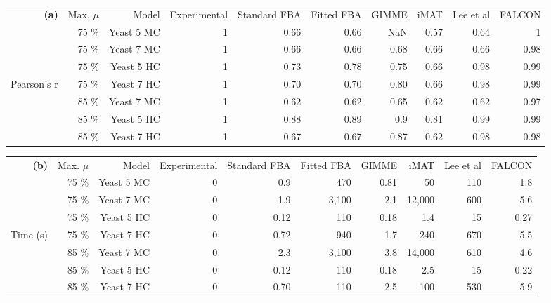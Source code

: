 \begin{table*}
\begin{center}
\small
\begin{tabular}{rrrrrrrrrr}
\textbf{(a)} \hspace{1.2cm} & Max. $\mu$ & Model & Experimental & 
  Standard FBA & Fitted FBA & GIMME & iMAT & Lee et al & FALCON\\
 & 75 \%& Yeast 5 MC & 1 & 0.66 & 0.66 & NaN  & 0.57 & 0.64 & 1 \\
 & 75 \%& Yeast 7 MC & 1 & 0.66 & 0.66 & 0.68 & 0.66 & 0.66 & 0.98\\
 & 75 \%& Yeast 5 HC & 1 & 0.73 & 0.78 & 0.75 & 0.66 & 0.98 & 0.99\\
Pearson's r  
 & 75 \%& Yeast 7 HC & 1 & 0.70 & 0.70 & 0.80 & 0.66 & 0.98 & 0.99\\
 & 85 \%& Yeast 7 MC & 1 & 0.62 & 0.62 & 0.65 & 0.62 & 0.62 & 0.97\\
 & 85 \%& Yeast 5 HC & 1 & 0.88 & 0.89 & 0.9  & 0.81 & 0.99 & 0.99\\
 & 85 \%& Yeast 7 HC & 1 & 0.67 & 0.67 & 0.87 & 0.62 & 0.98 & 0.98\\
\end{tabular}
\begin{tabular}{rrrrrrrrrr}
\textbf{(b)} \hspace{1.2cm} & Max. $\mu$ & Model & Experimental & 
  Standard FBA & Fitted FBA & GIMME & iMAT & Lee et al & FALCON\\
 & 75 \%& Yeast 5 MC & 0 & 0.9  & 470   & 0.81  & 50     & 110 & 1.8 \\
 & 75 \%& Yeast 7 MC & 0 & 1.9  & 3,100 & 2.1   & 12,000 & 600 & 5.6 \\
 & 75 \%& Yeast 5 HC & 0 & 0.12 & 110   & 0.18  & 1.4    & 15  & 0.27\\
Time (s) 
 & 75 \%& Yeast 7 HC & 0 & 0.72 & 940   & 1.7   & 240    & 670 & 5.5 \\
 & 85 \%& Yeast 7 MC & 0 & 2.3  & 3,100 & 3.8   & 14,000 & 610 & 4.6 \\
 & 85 \%& Yeast 5 HC & 0 & 0.12 & 110   & 0.18  & 2.5    & 15  & 0.22\\
 & 85 \%& Yeast 7 HC & 0 & 0.70 & 110   & 2.5   & 100    & 530 & 5.9\\
\end{tabular}
\end{center}
\caption{Performance of FALCON and other CBM methods for predicting
yeast exometabolic fluxes in two growth conditions with highly (HC)
and minimally (MC) constrained models \textbf{(a)} and associated
timing analysis \textbf{(b)}. For Lee et al. and FALCON methods, the
mean time for a single run of the method is listed; all other methods
did not have any stochasticity employed. Values are shown in two
significant figures. Method descriptions can be found in
\citealt{Lee2012}.}
\label{tab:FalcPerf}
\end{table*}

